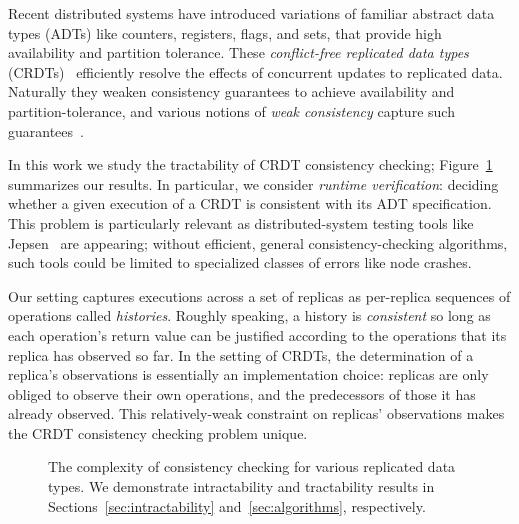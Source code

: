 

Recent distributed systems have introduced variations of familiar abstract data types (ADTs) like counters, registers, flags, and sets, that provide high availability and partition tolerance. These \emph{conflict-free replicated data types} (CRDTs)~\cite{DBLP:conf/sss/ShapiroPBZ11} efficiently resolve the effects of concurrent updates to replicated data. Naturally they weaken consistency guarantees to achieve availability and partition-tolerance, and various notions of \emph{weak consistency} capture such guarantees~\cite{DBLP:conf/pdis/TerryDPSTW94, DBLP:conf/sosp/TerryTPDSH95, DBLP:conf/popl/MansonPA05, DBLP:journals/ftpl/Burckhardt14, DBLP:conf/popl/BurckhardtGYZ14}.

In this work we study the tractability of CRDT consistency checking; Figure~\ref{fig:results} summarizes our results. In particular, we consider \emph{runtime verification}: deciding whether a given execution of a CRDT is consistent with its ADT specification. This problem is particularly relevant as distributed-system testing tools like Jepsen~\cite{MISC:Jepsen} are appearing; without efficient, general consistency-checking algorithms, such tools could be limited to specialized classes of errors like node crashes.

Our setting captures executions across a set of replicas as per-replica sequences of operations called \emph{histories}. Roughly speaking, a history is \emph{consistent} so long as each operation’s return value can be justified according to the operations that its replica has observed so far. In the setting of CRDTs, the determination of a replica’s observations is essentially an implementation choice: replicas are only obliged to observe their own operations, and the predecessors of those it has already observed. This relatively-weak constraint on replicas’ observations makes the CRDT consistency checking problem unique.

\begin{figure}[t]
  \centering
  
  \caption{The complexity of consistency checking for various replicated data types. We demonstrate intractability and tractability results in Sections~\ref{sec:intractability} and~\ref{sec:algorithms}, respectively.}
  \label{fig:results}
\end{figure}

